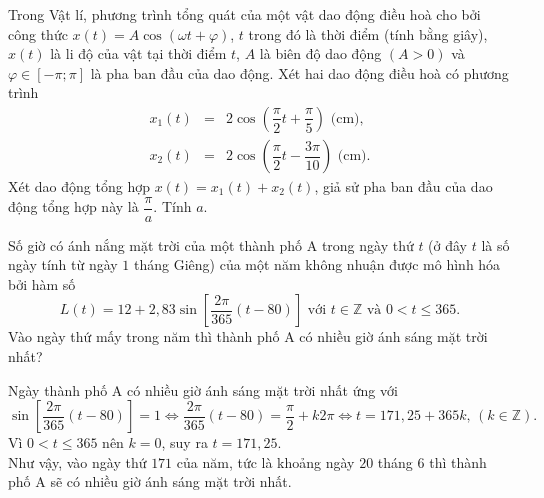 \begin{ex}%
	Trong Vật lí, phương trình tổng quát của một vật dao động điều hoà cho bởi công thức $x(t)=A\cos(\omega t+\varphi)$, $t$ trong đó   là thời điểm (tính bằng giây), $x(t)$  là li độ của vật tại thời điểm $t$, $A$ là biên độ dao động $(A>0)$ và $\varphi \in \left[-\pi; \pi \right]$ là pha ban đầu của dao động. Xét hai dao động điều hoà có phương trình
	\allowdisplaybreaks
	\begin{eqnarray*}
		x_{1}(t)&=&2\cos \left(\dfrac{\pi}{2}t+\dfrac{\pi}{5} \right)\text{ (cm)},\\
		x_{2}(t)&=&2\cos \left(\dfrac{\pi}{2}t -\dfrac{3\pi}{10}\right)\text{ (cm)}.
	\end{eqnarray*}
	Xét dao động tổng hợp $x(t)=x_{1}(t) + x_{2}(t)$, giả sử pha ban đầu của dao động tổng hợp này là $\dfrac{\pi}{a}$. Tính $a$.

\end{ex}

\begin{ex}%
	Số giờ có ánh nắng mặt trời của một thành phố A trong ngày thứ $t$ (ở đây $t$ là số ngày tính từ ngày $1$ tháng Giêng) của một năm không nhuận được mô hình hóa bởi hàm số
	$$L(t)=12+2{,}83\sin\left[\dfrac{2\pi}{365}(t-80)\right]\text{ với } t\in \mathbb{Z} \text{ và } 0<t\le 365.$$
	Vào ngày thứ mấy  trong năm thì thành phố A có nhiều giờ ánh sáng mặt trời nhất?
	
	\loigiai 
	{
		Ngày thành phố A có nhiều giờ ánh sáng mặt trời nhất ứng với 
		$$\sin\left[\dfrac{2\pi}{365}(t-80)\right]=1\Leftrightarrow\dfrac{2\pi}{365}(t-80)=\dfrac{\pi}{2}+k2\pi\Leftrightarrow t=171{,}25+365k,\,(k\in\mathbb{Z}).$$
		Vì $0<t\le 365$ nên $k=0$, suy ra $t=171{,}25$.\\
		Như vậy, vào ngày thứ $171$ của năm, tức là khoảng ngày $20$ tháng $6$ thì thành phố A sẽ có nhiều giờ ánh sáng mặt trời nhất.
	}
\end{ex}

